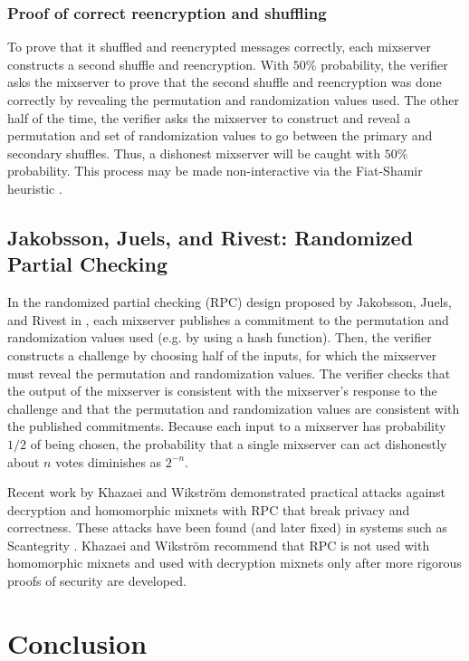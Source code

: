\subsubsection{Proof of correct reencryption and shuffling}

To prove that it shuffled and reencrypted messages correctly, each mixserver constructs a second shuffle and reencryption. With $50\%$ probability, the verifier asks the mixserver to prove that the second shuffle and reencryption was done correctly by revealing the permutation and randomization values used. The other half of the time, the verifier asks the mixserver to construct and reveal a permutation and set of randomization values to go between the primary and secondary shuffles. Thus, a dishonest mixserver will be caught with $50\%$ probability. This process may be made non-interactive via the Fiat-Shamir heuristic \cite{fiat-shamir}.

\subsection{Jakobsson, Juels, and Rivest: Randomized Partial Checking}

In the randomized partial checking (RPC) design proposed by Jakobsson, Juels, and Rivest in \cite{jjr02}, each mixserver publishes a commitment to the permutation and randomization values used (e.g. by using a hash function). Then, the verifier constructs a challenge by choosing half of the inputs, for which the mixserver must reveal the permutation and randomization values. The verifier checks that the output of the mixserver is consistent with the mixserver's response to the challenge and that the permutation and randomization values are consistent with the published commitments. Because each input to a mixserver has probability $1/2$ of being chosen, the probability that a single mixserver can act dishonestly about $n$ votes diminishes as $2^{-n}$.

Recent work by Khazaei and Wikstr\"{o}m \cite{khazaei13} demonstrated practical attacks against decryption and homomorphic mixnets with RPC that break privacy and correctness. These attacks have been found (and later fixed) in systems such as Scantegrity \cite{scantegrity}. Khazaei and Wikstr\"{o}m recommend that RPC is not used with homomorphic mixnets and used with decryption mixnets only after more rigorous proofs of security are developed.

\section{Conclusion} \label{evote:conclusion}

